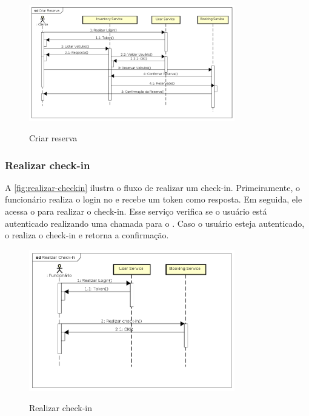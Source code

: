 \begin{figure}[H]
    \centering
    \caption{Criar reserva}
    \includegraphics[width=0.8\textwidth]{media/criar-reserva.png}
    \label{fig:realizar-reserva}
\end{figure}

\subsubsection{Realizar check-in}
A \autoref{fig:realizar-checkin} ilustra o fluxo de realizar um check-in. Primeiramente, o funcionário realiza o login no  e recebe um token como resposta. Em seguida, ele acessa o  para realizar o check-in. Esse serviço verifica se o usuário está autenticado realizando uma chamada para o . Caso o usuário esteja autenticado, o  realiza o check-in e retorna a confirmação.

\begin{figure}[H]
    \centering
    \caption{Realizar check-in}
    \includegraphics[width=0.8\textwidth]{media/realizar-checkin.png}
    \label{fig:realizar-checkin}
\end{figure}

